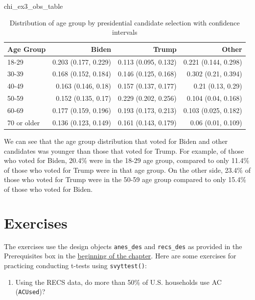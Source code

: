 \documentclass[
]{krantz}
\makeatletter
\newenvironment{Shaded}{\begin{snugshade}}{\end{snugshade}}
\newcommand{\NormalTok}[1]{#1}
\providecommand{\tightlist}{%
  \setlength{\itemsep}{0pt}\setlength{\parskip}{0pt}}
\newenvironment{kframe}{%
\medskip{}
\setlength{\fboxsep}{.8em}
 \def\at@end@of@kframe{}%
 \ifinner\ifhmode%
  \def\at@end@of@kframe{\end{minipage}}%
  \begin{minipage}{\columnwidth}%
 \fi\fi%
 \def\FrameCommand##1{\hskip\@totalleftmargin \hskip-\fboxsep
 \colorbox{shadecolor}{##1}\hskip-\fboxsep
     \hskip-\linewidth \hskip-\@totalleftmargin \hskip\columnwidth}%
 \MakeFramed {\advance\hsize-\width
   \@totalleftmargin\z@ \linewidth\hsize
   \@setminipage}}%
 {\par\unskip\endMakeFramed%
 \at@end@of@kframe}
\renewenvironment{Shaded}{\begin{kframe}}{\end{kframe}}
\makeatother
\begin{document}
\begin{Shaded}
\begin{Highlighting}[]
\NormalTok{chi\_ex3\_obs\_table}
\end{Highlighting}
\end{Shaded}



\begin{longtable}{l|rrr}
\caption{\label{tab:stattest-chi-ex3-tab}Distribution of age group by presidential candidate selection with confidence intervals}\\
\toprule
\multicolumn{1}{l}{Age Group} & Biden & Trump & Other \\ 
\midrule
18-29 & 0.203 (0.177, 0.229) & 0.113 (0.095, 0.132) & 0.221 (0.144, 0.298) \\ 
30-39 & 0.168 (0.152, 0.184) & 0.146 (0.125, 0.168) & 0.302 (0.21, 0.394) \\ 
40-49 & 0.163 (0.146, 0.18) & 0.157 (0.137, 0.177) & 0.21 (0.13, 0.29) \\ 
50-59 & 0.152 (0.135, 0.17) & 0.229 (0.202, 0.256) & 0.104 (0.04, 0.168) \\ 
60-69 & 0.177 (0.159, 0.196) & 0.193 (0.173, 0.213) & 0.103 (0.025, 0.182) \\ 
70 or older & 0.136 (0.123, 0.149) & 0.161 (0.143, 0.179) & 0.06 (0.01, 0.109) \\ 
\bottomrule
\end{longtable}

We can see that the age group distribution that voted for Biden and other candidates was younger than those that voted for Trump. For example, of those who voted for Biden, 20.4\% were in the 18-29 age group, compared to only 11.4\% of those who voted for Trump were in that age group. On the other side, 23.4\% of those who voted for Trump were in the 50-59 age group compared to only 15.4\% of those who voted for Biden.

\hypertarget{stattest-exercises}{%
\section{Exercises}\label{stattest-exercises}}

The exercises use the design objects \texttt{anes\_des} and \texttt{recs\_des} as provided in the Prerequisites box in the \protect\hyperlink{c06-statistical-testing}{beginning of the chapter}. Here are some exercises for practicing conducting t-tests using \texttt{svyttest()}:

\begin{enumerate}
\def\labelenumi{\arabic{enumi}.}
\tightlist
\item
  Using the RECS data, do more than 50\% of U.S. households use AC (\texttt{ACUsed})?
\end{enumerate}
\end{document}
